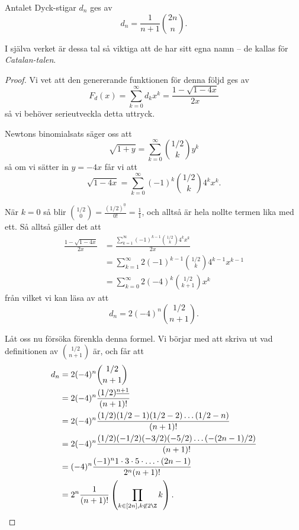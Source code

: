 \documentclass[nobib]{tufte-handout}
\begin{document}
\begin{theorem}\label{theorem_dyck_paths_counted_by_catalan}
    Antalet Dyck-stigar $d_n$ ges av
    $$d_n = \frac{1}{n + 1}\binom{2n}{n}.$$

    I själva verket är dessa tal så viktiga att de har sitt egna namn -- de kallas för \emph{Catalan-talen}.

    \begin{proof}
        Vi vet att den genererande funktionen för denna följd ges av
        $$F_d(x) = \sum_{k=0}^{\infty} d_k x^k = \frac{1 - \sqrt{1 - 4x}}{2x}$$
        så vi behöver serieutveckla detta uttryck.

        Newtons binomialsats säger oss att
        $$\sqrt{1 + y} = \sum_{k=0}^{\infty} \binom{1/2}{k} y^k$$
        så om vi sätter in $y = -4x$ får vi att
        $$\sqrt{1 - 4x} = \sum_{k=0}^{\infty} (-1)^k \binom{1/2}{k} 4^k x^k.$$
        
        När $k=0$ så blir $\binom{1/2}{0} = \frac{(1/2)^{\underline{0}}}{0!} = \frac{1}{1}$, och alltså är hela nollte termen lika med ett. Så alltså gäller det att
        \begin{align*}
            \frac{1 - \sqrt{1 - 4x}}{2x} &= \frac{\sum_{k=1}^{\infty} (-1)^{k-1} \binom{1/2}{k} 4^k x^k}{2x}\\
            &= \sum_{k=1}^{\infty} 2(-1)^{k-1} \binom{1/2}{k} 4^{k-1} x^{k-1}\\
            &= \sum_{k=0}^{\infty} 2 (-4)^{k}\binom{1/2}{k+1} x^k
        \end{align*}
        från vilket vi kan läsa av att
        $$d_n = 2 (-4)^{n}\binom{1/2}{n+1}.$$

        Låt oss nu försöka förenkla denna formel. Vi börjar med att skriva ut vad definitionen av $\binom{1/2}{n+1}$ är, och får att
        \begin{align*}
            d_n &= 2 (-4)^{n}\binom{1/2}{n+1}\\
            &= 2 (-4)^n \frac{(1/2)^{\underline{n+1}}}{(n+1)!}\\
            &= 2 (-4)^n \frac{(1/2)(1/2 - 1)(1/2 - 2)\ldots(1/2 - n)}{(n+1)!}\\
            &= 2 (-4)^n \frac{(1/2)(-1/2)(-3/2)(-5/2)\ldots(-(2n-1)/2)}{(n+1)!}\\
            &= (-4)^n \frac{(-1)^n 1\cdot3\cdot5\cdot\ldots\cdot(2n-1)}{2^n (n+1)!}\\
            &= 2^n \frac{1}{(n+1)!}\left(\prod_{k \in [2n], k \not\in2\Z} k\right).
        \end{align*}


\end{proof}
\end{theorem}
\end{document}
